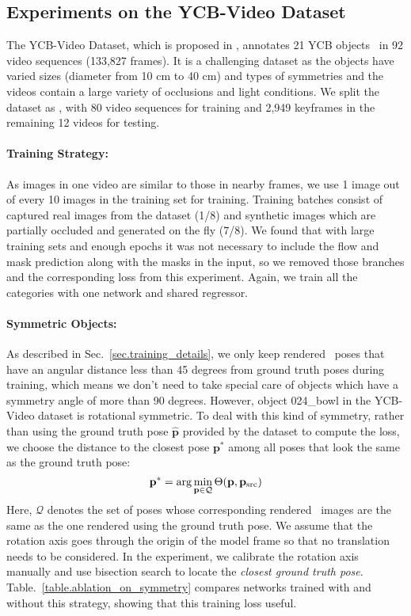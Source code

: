 \documentclass[twocolumn]{svjour3}
\newcommand{\rend}[0]{rendered}
\newcommand{\gtpose}[0]{\mathbf{\hat{p}}}
\begin{document}
\subsection{Experiments on the YCB-Video Dataset}

The YCB-Video Dataset, which is proposed in \citep{xiang2017posecnn}, annotates 21 YCB objects~\citep{calli2015ycb} in 92 video sequences (133,827 frames). It is a challenging dataset as the objects have varied sizes (diameter from 10 cm to 40 cm) and types of symmetries and the videos contain a large variety of occlusions and light conditions. We split the dataset as \citep{xiang2017posecnn}, with 80 video sequences for training and 2,949 keyframes in the remaining 12 videos for testing.

\paragraph{Training Strategy:} As images in one video are similar to those in nearby frames, we use 1 image out of every 10 images in the training set for training. Training batches consist of captured real images from the dataset (1/8) and synthetic images which are partially occluded and generated on the fly (7/8). We found that with large training sets and enough epochs it was not necessary to include the flow and mask prediction along with the masks in the input, so we removed those branches and the corresponding loss from this experiment. Again, we train all the categories with one network and shared regressor.

\paragraph{Symmetric Objects:} As described in Sec.~\ref{sec.training_details}, we only keep \rend~ poses that have an angular distance less than 45 degrees from ground truth poses during training, which means we don't need to take special care of objects which have a symmetry angle of more than 90 degrees. However, object 024\_bowl in the YCB-Video dataset is rotational symmetric. To deal with this kind of symmetry, rather than using the ground truth pose $\gtpose$ provided by the dataset to compute the loss, we choose the distance to the closest pose $\mathbf{p}^*$ among all poses that look the same as the ground truth pose:
\begin{equation}
\centering
    \mathbf{p}^*=\arg\min_{\mathbf{p}\in \mathcal{Q}}\Theta(\mathbf{p}, \mathbf{p}_\text{src})
\end{equation}
Here, $\mathcal{Q}$ denotes the set of poses whose corresponding \rend~ images are the same as the one rendered using the ground truth pose. We assume that the rotation axis goes through the origin of the model frame so that no translation needs to be considered. In the experiment, we calibrate the rotation axis manually and use bisection search to locate the \textit{closest ground truth pose}. Table.~\ref{table.ablation_on_symmetry} compares networks trained with and without this strategy, showing that this training loss useful.
\end{document}
